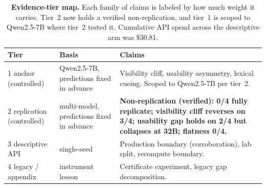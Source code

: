 \begin{table}[t]
\centering
\caption{\textbf{Evidence-tier map.} Each family of claims is labeled by how
much weight it carries. Tier~2 now holds a verified non-replication, and
tier~1 is scoped to Qwen2.5-7B where tier~2 tested it. Cumulative API spend
across the descriptive arm was \$30.81.}
\label{tab:tiers}
\small
\begin{tabular}{@{}llp{7.2cm}@{}}
\toprule
Tier & Basis & Claims \\
\midrule
1 anchor (controlled) & Qwen2.5-7B, predictions fixed in advance & Visibility cliff, usability asymmetry, lexical cueing. Scoped to Qwen2.5-7B per tier~2. \\
2 replication (controlled) & multi-model, predictions fixed in advance & \textbf{Non-replication (verified): 0/4 fully replicate; visibility cliff reverses on 3/4; usability gap holds on 2/4 but collapses at 32B; flatness 0/4.} \\
3 descriptive API & single-seed & Production boundary (corroboration), lab split, recompute boundary. \\
4 legacy / appendix & instrument lesson & Certificate experiment, legacy gap decomposition. \\
\bottomrule
\end{tabular}
\end{table}

